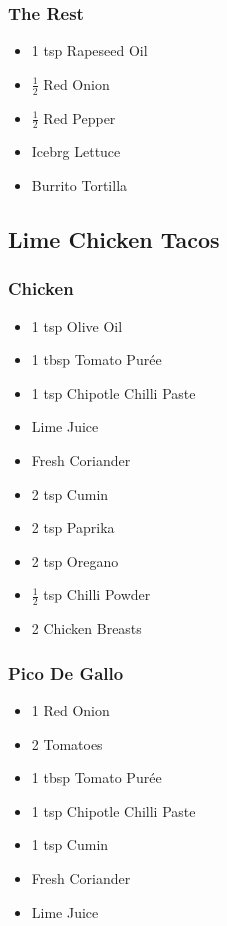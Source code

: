 \documentclass[11pt, english]{article}
\begin{document}
		\subsubsection*{The Rest}

	\begin{itemize}
        \setlength\itemsep{0cm}
                \item 1 tsp Rapeseed Oil
		\item $\frac{1}{2}$ Red Onion
		\item $\frac{1}{2}$ Red Pepper
		\item Icebrg Lettuce
		\item Burrito Tortilla
        \end{itemize}

\newpage

	\subsection{Lime Chicken Tacos}

		\subsubsection*{Chicken}

	\begin{itemize}
        \setlength\itemsep{0cm}
                \item 1 tsp Olive Oil
		\item 1 tbsp Tomato Pur\'{e}e
		\item 1 tsp Chipotle Chilli Paste
		\item Lime Juice
		\item Fresh Coriander
		\item 2 tsp Cumin
		\item 2 tsp Paprika
		\item 2 tsp Oregano
		\item $\frac{1}{2}$ tsp Chilli Powder
		\item 2 Chicken Breasts
        \end{itemize}

		\subsubsection*{Pico De Gallo}
	
	\begin{itemize}
        \setlength\itemsep{0cm}
                \item 1 Red Onion
		\item 2 Tomatoes
		\item 1 tbsp Tomato Pur\'{e}e
		\item 1 tsp Chipotle Chilli Paste
		\item 1 tsp Cumin
		\item Fresh Coriander
		\item Lime Juice
        \end{itemize}
\end{document}
